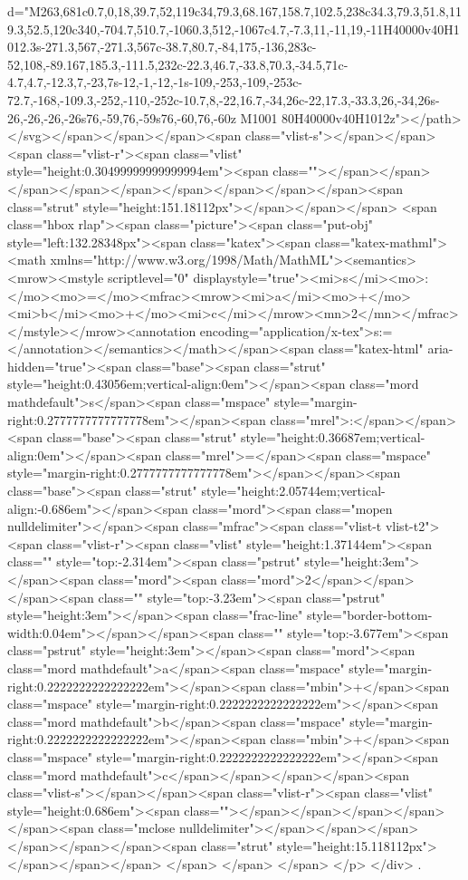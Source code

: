 d="M263,681c0.7,0,18,39.7,52,119c34,79.3,68.167,158.7,102.5,238c34.3,79.3,51.8,119.3,52.5,120c340,-704.7,510.7,-1060.3,512,-1067c4.7,-7.3,11,-11,19,-11H40000v40H1012.3s-271.3,567,-271.3,567c-38.7,80.7,-84,175,-136,283c-52,108,-89.167,185.3,-111.5,232c-22.3,46.7,-33.8,70.3,-34.5,71c-4.7,4.7,-12.3,7,-23,7s-12,-1,-12,-1s-109,-253,-109,-253c-72.7,-168,-109.3,-252,-110,-252c-10.7,8,-22,16.7,-34,26c-22,17.3,-33.3,26,-34,26s-26,-26,-26,-26s76,-59,76,-59s76,-60,76,-60z M1001 80H40000v40H1012z"></path></svg></span></span></span><span class="vlist-s">​</span></span><span class="vlist-r"><span class="vlist" style="height:0.30499999999999994em"><span class=""></span></span></span></span></span></span></span></span></span><span class="strut" style="height:151.18112px"></span></span></span>
<span class="hbox rlap"><span class="picture"><span class="put-obj" style="left:132.28348px"><span class="katex"><span class="katex-mathml"><math xmlns="http://www.w3.org/1998/Math/MathML"><semantics><mrow><mstyle scriptlevel="0" displaystyle="true"><mi>s</mi><mo>:</mo><mo>=</mo><mfrac><mrow><mi>a</mi><mo>+</mo><mi>b</mi><mo>+</mo><mi>c</mi></mrow><mn>2</mn></mfrac></mstyle></mrow><annotation encoding="application/x-tex">\displaystyle s:=</annotation></semantics></math></span><span class="katex-html" aria-hidden="true"><span class="base"><span class="strut" style="height:0.43056em;vertical-align:0em"></span><span class="mord mathdefault">s</span><span class="mspace" style="margin-right:0.2777777777777778em"></span><span class="mrel">:</span></span><span class="base"><span class="strut" style="height:0.36687em;vertical-align:0em"></span><span class="mrel">=</span><span class="mspace" style="margin-right:0.2777777777777778em"></span></span><span class="base"><span class="strut" style="height:2.05744em;vertical-align:-0.686em"></span><span class="mord"><span class="mopen nulldelimiter"></span><span class="mfrac"><span class="vlist-t vlist-t2"><span class="vlist-r"><span class="vlist" style="height:1.37144em"><span class="" style="top:-2.314em"><span class="pstrut" style="height:3em"></span><span class="mord"><span class="mord">2</span></span></span><span class="" style="top:-3.23em"><span class="pstrut" style="height:3em"></span><span class="frac-line" style="border-bottom-width:0.04em"></span></span><span class="" style="top:-3.677em"><span class="pstrut" style="height:3em"></span><span class="mord"><span class="mord mathdefault">a</span><span class="mspace" style="margin-right:0.2222222222222222em"></span><span class="mbin">+</span><span class="mspace" style="margin-right:0.2222222222222222em"></span><span class="mord mathdefault">b</span><span class="mspace" style="margin-right:0.2222222222222222em"></span><span class="mbin">+</span><span class="mspace" style="margin-right:0.2222222222222222em"></span><span class="mord mathdefault">c</span></span></span></span><span class="vlist-s">​</span></span><span class="vlist-r"><span class="vlist" style="height:0.686em"><span class=""></span></span></span></span></span><span class="mclose nulldelimiter"></span></span></span></span></span></span><span class="strut" style="height:15.118112px"></span></span></span>
</span>
</span>​ </span>
</p>
</div>
.
